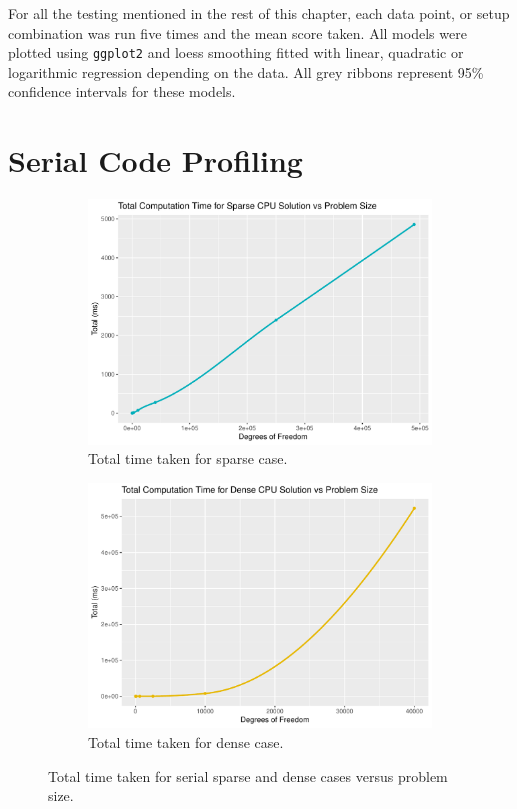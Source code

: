 \begin{remark}
For all the testing mentioned in the rest of this chapter, each data point, or setup combination was run five times and the mean score taken. All models were plotted using \texttt{ggplot2} and loess smoothing fitted with linear, quadratic or logarithmic regression depending on the data. All grey ribbons represent 95\% confidence intervals for these models.
\end{remark}

\section{Serial Code Profiling}

\begin{figure}
	\centering
	\begin{subfigure}{0.48\linewidth}
		\centering
		\includegraphics[width = \linewidth]{Plots/total_sparse_cpu}
		\caption{Total time taken for sparse case.}
		\label{fig:tot_sparse_cpu}
	\end{subfigure}\hfill
	\begin{subfigure}{0.48\linewidth}
		\centering
		\includegraphics[width=\linewidth]{Plots/total_dense_cpu}
		\caption{Total time taken for dense case.}
		\label{fig:tot_dense_cpu}
	\end{subfigure}
	\caption{Total time taken for serial sparse and dense cases versus problem size.}
	\label{fig:tot_cpu}
\end{figure}

